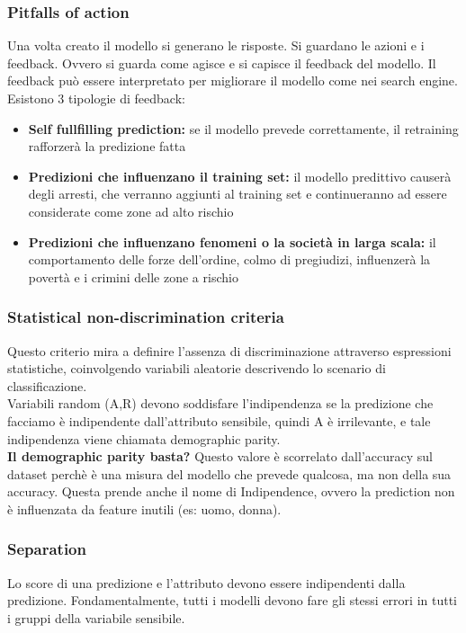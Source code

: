 \subsubsection{Pitfalls of action}
Una volta creato il modello si generano le risposte. Si guardano le azioni e i feedback. Ovvero si guarda come agisce e si capisce il feedback del modello. Il feedback può essere interpretato per migliorare il modello come nei search engine. 
\\
Esistono 3 tipologie di feedback:
\begin{itemize}
    \item \textbf{Self fullfilling prediction:} se il modello prevede correttamente, il retraining rafforzerà la predizione fatta
    \item \textbf{Predizioni che influenzano il training set:} il modello predittivo causerà degli arresti, che verranno aggiunti al training set e continueranno ad essere considerate come zone ad alto rischio
    \item \textbf{Predizioni che influenzano fenomeni o la società in larga scala:} il comportamento delle forze dell'ordine, colmo di pregiudizi, influenzerà la povertà e i crimini delle zone a rischio
\end{itemize}

\subsubsection{Statistical non-discrimination criteria}
Questo criterio mira a definire l'assenza di discriminazione attraverso espressioni statistiche, coinvolgendo variabili aleatorie descrivendo lo scenario di classificazione. 
\\
Variabili random (A,R) devono soddisfare l'indipendenza se la predizione che facciamo è indipendente dall'attributo sensibile, quindi A è irrilevante, e tale indipendenza viene chiamata demographic parity. 
\\
\textbf{Il demographic parity basta?} Questo valore è scorrelato dall'accuracy sul dataset perchè è una misura del modello che prevede qualcosa, ma non della sua accuracy. Questa prende anche il nome di Indipendence, ovvero la prediction non è influenzata da feature inutili (es: uomo, donna). 

\subsubsection{Separation}
Lo score di una predizione e l'attributo devono essere indipendenti dalla predizione. Fondamentalmente, tutti i modelli devono fare gli stessi errori in tutti i gruppi della variabile sensibile. 

